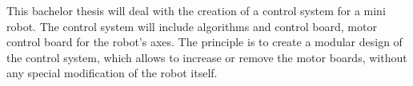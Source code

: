 This bachelor thesis will deal with the creation of a control system for a mini robot. The control system will include algorithms and control board, motor control board for the robot's axes.  The principle is to create a modular design of the control system, which allows to increase or remove the motor boards, without any special modification of the robot itself. 